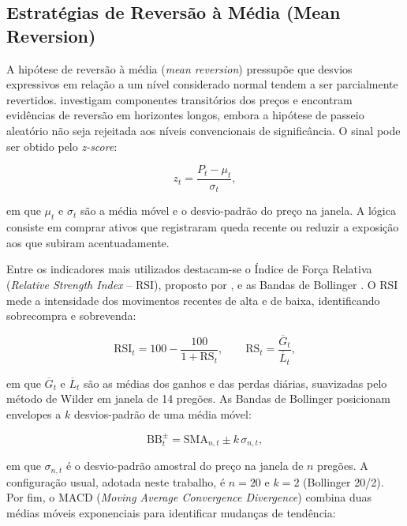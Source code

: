 \subsection{Estratégias de Reversão à Média (Mean Reversion)}

A hipótese de reversão à média (\textit{mean reversion}) pressupõe que desvios expressivos em relação a um nível considerado normal tendem a ser parcialmente revertidos. \citet{PoterbaSummers1988} investigam componentes transitórios dos preços e encontram evidências de reversão em horizontes longos, embora a hipótese de passeio aleatório não seja rejeitada aos níveis convencionais de significância. O sinal pode ser obtido pelo \textit{z-score}:

\begin{equation}
z_t = \frac{P_t - \mu_t}{\sigma_t},
\end{equation}

\noindent em que $\mu_t$ e $\sigma_t$ são a média móvel e o desvio-padrão do preço na janela. A lógica consiste em comprar ativos que registraram queda recente ou reduzir a exposição aos que subiram acentuadamente.

Entre os indicadores mais utilizados destacam-se o Índice de Força Relativa (\textit{Relative Strength Index} -- RSI), proposto por \citet{Wilder1978}, e as Bandas de Bollinger \citep{Bollinger2001}. O RSI mede a intensidade dos movimentos recentes de alta e de baixa, identificando sobrecompra e sobrevenda:

\begin{equation}
\mathrm{RSI}_t = 100 - \frac{100}{1 + \mathrm{RS}_t}, \qquad \mathrm{RS}_t = \frac{\overline{G}_t}{\overline{L}_t},
\end{equation}

\noindent em que $\overline{G}_t$ e $\overline{L}_t$ são as médias dos ganhos e das perdas diárias, suavizadas pelo método de Wilder em janela de 14 pregões. As Bandas de Bollinger posicionam envelopes a $k$ desvios-padrão de uma média móvel:

\begin{equation}
\mathrm{BB}^{\pm}_t = \mathrm{SMA}_{n,t} \pm k\,\sigma_{n,t},
\end{equation}

\noindent em que $\sigma_{n,t}$ é o desvio-padrão amostral do preço na janela de $n$ pregões. A configuração usual, adotada neste trabalho, é $n = 20$ e $k = 2$ (Bollinger 20/2). Por fim, o MACD (\textit{Moving Average Convergence Divergence}) combina duas médias móveis exponenciais para identificar mudanças de tendência:

